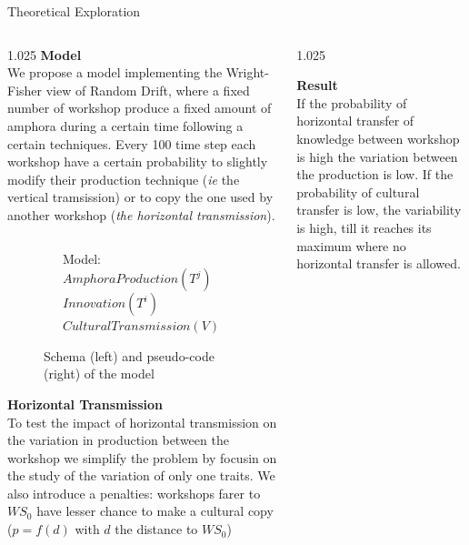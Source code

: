 \documentclass[final]{beamer}
\newlength{\sepwid}
\newlength{\onecolwid}
\newlength{\twocolwid}
\begin{document}
\begin{frame}[t]
\begin{columns}[t]
\begin{column}{\twocolwid}
\begin{block}{Theoretical Exploration}
\begin{columns}[t,totalwidth=\twocolwid]
\begin{column}{1.025\onecolwid}
{\textbf{Model}}\\
\justify
We propose a model implementing the Wright-Fisher view of Random Drift, where a fixed number of workshop produce a fixed amount of amphora during a certain time following a certain techniques. Every 100 time step each workshop have a certain probability to slightly modify their production technique (\emph{ie} the vertical tramsission) or to copy the one used by another workshop (\emph{the horizontal transmission}). 
	\begin{figure}
\begin{columns}
    \begin{column}{.6\textwidth}
	    \centering
	\resizebox{\textwidth}{!}{
	    
}
	    \label{fig:mod}
    \end{column}
    \begin{column}{.4\textwidth}
	\begin{algorithmic}
	    \tiny
	    \State Model:
	    \State $AmphoraProduction(T^j)$
	    \State $Innovation(T^i)$
	    \State $CulturalTransmission(V)$
	    \EndIf
	    \EndFor
	    \EndLoop
	\end{algorithmic}
    \end{column}
\end{columns}

	    \caption{Schema (left) and pseudo-code (right) of the model }
	\end{figure}

{\textbf{Horizontal Transmission}}\\
\justify
To test the impact of horizontal transmission on the variation in production between the workshop we simplify the problem by focusin on the study of the variation of only one traits. We also introduce a penalties: workshops farer to $WS_0$ have lesser chance to make a cultural copy ($p=f(d)$ with $d$ the distance to $WS_0$)


\end{column}


\begin{column}{1.025\onecolwid} %
\justify

{\textbf{Result}}\\
\justify
If the probability of horizontal transfer of knowledge between workshop is high the variation between the production is low. If the probability of cultural transfer is low, the variability is high, till it reaches its maximum where no horizontal transfer is allowed.


\end{column}
\end{columns}
\end{block}
\end{column}
\end{columns}
\end{frame}
\end{document}
